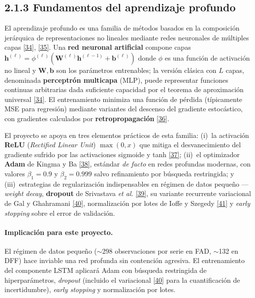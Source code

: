 \documentclass[12pt,letterpaper]{report}
\newcommand{\cita}[1]{\hyperref[bib:#1]{[#1]}}
\begin{document}
\subsection{2.1.3 Fundamentos del aprendizaje profundo}

El aprendizaje profundo es una familia de métodos basados en la composición jerárquica de representaciones no lineales mediante redes neuronales de múltiples capas \cita{34}, \cita{35}. Una \textbf{red neuronal artificial} compone capas $\mathbf{h}^{(\ell)} = \phi^{(\ell)}(\mathbf{W}^{(\ell)}\mathbf{h}^{(\ell-1)} + \mathbf{b}^{(\ell)})$ donde $\phi$ es una función de activación no lineal y $\mathbf{W}, \mathbf{b}$ son los parámetros entrenables; la versión clásica con $L$ capas, denominada \textbf{perceptrón multicapa} (MLP), puede representar funciones continuas arbitrarias dada suficiente capacidad por el teorema de aproximación universal \cita{34}. El entrenamiento minimiza una función de pérdida (típicamente MSE para regresión) mediante variantes del descenso del gradiente estocástico, con gradientes calculados por \textbf{retropropagación} \cita{36}.

El proyecto se apoya en tres elementos prácticos de esta familia: (i)~la activación \textbf{ReLU} (\textit{Rectified Linear Unit}) $\max(0, x)$ que mitiga el desvanecimiento del gradiente sufrido por las activaciones sigmoide y tanh \cita{37}; (ii)~el optimizador \textbf{Adam} de Kingma y Ba \cita{38}, estándar \textit{de facto} en redes profundas modernas, con valores $\beta_1 = 0.9$ y $\beta_2 = 0.999$ salvo refinamiento por búsqueda restringida; y (iii)~estrategias de regularización indispensables en régimen de datos pequeño ---\textit{weight decay}, \textbf{dropout} de Srivastava \textit{et al.} \cita{39}, su variante recurrente variacional de Gal y Ghahramani \cita{40}, normalización por lotes de Ioffe y Szegedy \cita{41} y \textit{early stopping} sobre el error de validación.

\paragraph{Implicación para este proyecto.} El régimen de datos pequeño ($\sim$298 observaciones por serie en FAD, $\sim$132 en DFF) hace inviable una red profunda sin contención agresiva. El entrenamiento del componente LSTM aplicará Adam con búsqueda restringida de hiperparámetros, \textit{dropout} (incluido el variacional \cita{40} para la cuantificación de incertidumbre), \textit{early stopping} y normalización por lotes.
\end{document}
